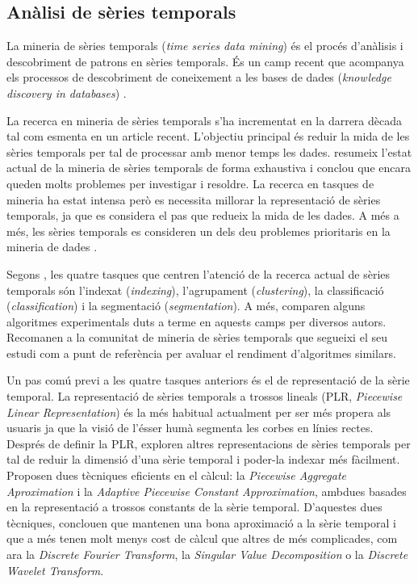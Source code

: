 \subsection{Anàlisi de sèries temporals}

La mineria de sèries temporals (\emph{time series data mining}) és el procés d'anàlisis i descobriment de patrons en sèries temporals. És un camp recent que acompanya els processos de descobriment de coneixement a les bases de dades (\emph{knowledge discovery in databases}) \parencite{last01}.


La recerca en mineria de sèries temporals s'ha incrementat en la darrera dècada tal com esmenta \textcite{fu11} en un article recent. L'objectiu principal és reduir la mida de les sèries temporals per tal de processar amb menor temps les dades.
\citeauthor{fu11} resumeix l'estat actual de la mineria de sèries temporals de forma exhaustiva i conclou que encara queden molts problemes per investigar i resoldre. La recerca en tasques de mineria ha estat intensa però es necessita millorar la representació de sèries temporals, ja que es considera el pas que redueix la mida de les dades. A més a més, les sèries temporals es consideren un dels deu problemes prioritaris  en la mineria de dades \parencite{yangwu06}.

Segons \textcite{keogh02}, les quatre tasques que centren l'atenció de la recerca actual de sèries temporals són l'indexat (\emph{indexing}), l'agrupament (\emph{clustering}), la classificació (\emph{classification}) i la segmentació (\emph{segmentation}). A més, \citeauthor{keogh02} comparen  alguns algoritmes experimentals duts a terme en aquests camps per diversos autors. Recomanen a la comunitat de mineria de sèries temporals que segueixi el seu estudi com a punt de referència per avaluar el rendiment d'algoritmes similars.

Un pas comú previ a les quatre tasques anteriors és el de representació de la sèrie temporal. 
La representació de sèries temporals a trossos lineals (PLR, \emph{Piecewise Linear Representation}) \parencite{keogh97,keogh98} {é}s la més habitual actualment per ser més propera als usuaris ja que la visió de l'ésser humà segmenta les corbes en línies rectes.
Després de definir la PLR, \textcite{keogh00,keogh01} exploren altres representacions de sèries temporals per tal de reduir la dimensió d'una sèrie temporal i poder-la indexar més fàcilment. Proposen dues tècniques eficients en el càlcul: la \emph{Piecewise Aggregate Aproximation} i la \emph{Adaptive Piecewise Constant Approximation}, ambdues basades en la representació a trossos constants de la sèrie temporal. 
D'aquestes dues tècniques, \citeauthor{keogh00,keogh01} conclouen que mantenen una bona aproximació a la sèrie temporal i que a més  tenen molt menys cost de càlcul que altres de més complicades, com ara la \emph{Discrete Fourier Transform},  la  \emph{Singular Value Decomposition} o la \emph{Discrete Wavelet Transform}.




